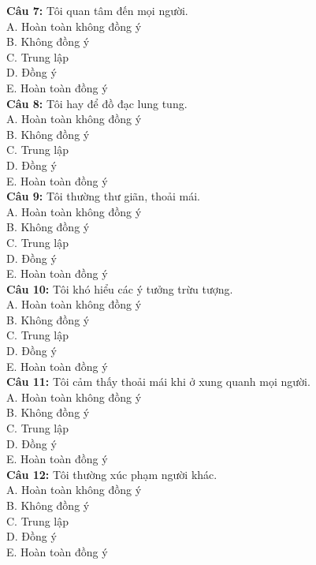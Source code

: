 \begin{multicols}{2}
\textbf{Câu 7:} Tôi quan tâm đến mọi người. \\
A. Hoàn toàn không đồng ý \\
B. Không đồng ý \\
C. Trung lập \\
D. Đồng ý \\
E. Hoàn toàn đồng ý \\

\textbf{Câu 8:} Tôi hay để đồ đạc lung tung. \\
A. Hoàn toàn không đồng ý \\
B. Không đồng ý \\
C. Trung lập \\
D. Đồng ý \\
E. Hoàn toàn đồng ý \\

\textbf{Câu 9:} Tôi thường thư giãn, thoải mái. \\
A. Hoàn toàn không đồng ý \\
B. Không đồng ý \\
C. Trung lập \\
D. Đồng ý \\
E. Hoàn toàn đồng ý \\

\textbf{Câu 10:} Tôi khó hiểu các ý tưởng trừu tượng. \\
A. Hoàn toàn không đồng ý \\
B. Không đồng ý \\
C. Trung lập \\
D. Đồng ý \\
E. Hoàn toàn đồng ý \\

\textbf{Câu 11:} Tôi cảm thấy thoải mái khi ở xung quanh mọi người. \\
A. Hoàn toàn không đồng ý \\
B. Không đồng ý \\
C. Trung lập \\
D. Đồng ý \\
E. Hoàn toàn đồng ý \\

\textbf{Câu 12:} Tôi thường xúc phạm người khác. \\
A. Hoàn toàn không đồng ý \\
B. Không đồng ý \\
C. Trung lập \\
D. Đồng ý \\
E. Hoàn toàn đồng ý \\


\end{multicols}
